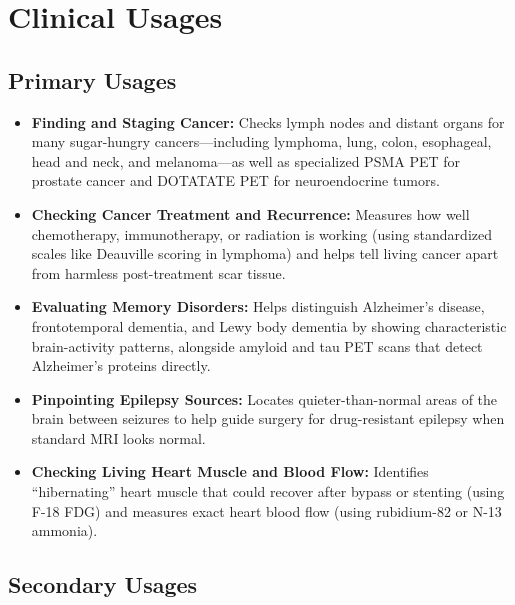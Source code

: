 \section{Clinical Usages}

\subsection{Primary Usages}

\begin{itemize}
    \item \textbf{Finding and Staging Cancer:} Checks lymph nodes and distant organs for many sugar-hungry cancers---including lymphoma, lung, colon, esophageal, head and neck, and melanoma---as well as specialized PSMA PET for prostate cancer and DOTATATE PET for neuroendocrine tumors.
    \item \textbf{Checking Cancer Treatment and Recurrence:} Measures how well chemotherapy, immunotherapy, or radiation is working (using standardized scales like Deauville scoring in lymphoma) and helps tell living cancer apart from harmless post-treatment scar tissue.
    \item \textbf{Evaluating Memory Disorders:} Helps distinguish Alzheimer's disease, frontotemporal dementia, and Lewy body dementia by showing characteristic brain-activity patterns, alongside amyloid and tau PET scans that detect Alzheimer's proteins directly.
    \item \textbf{Pinpointing Epilepsy Sources:} Locates quieter-than-normal areas of the brain between seizures to help guide surgery for drug-resistant epilepsy when standard MRI looks normal.
    \item \textbf{Checking Living Heart Muscle and Blood Flow:} Identifies ``hibernating'' heart muscle that could recover after bypass or stenting (using F-18 FDG) and measures exact heart blood flow (using rubidium-82 or N-13 ammonia).
\end{itemize}

\subsection{Secondary Usages}

